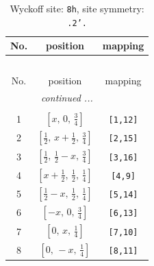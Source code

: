 \documentclass[fleqn,8pt]{jsarticle}
\begin{document}
\begin{longtable}{ccc}
\caption{Wyckoff site: {\tt 8h}, site symmetry: {\tt .2'.}}
 \\
 \hline \hline
No. & position & mapping \\ \hline \endfirsthead

\multicolumn{2}{l}{\tablename\ \thetable{}} \\
 \hline \hline
No. & position & mapping \\ \hline \endhead

 \hline \hline
\multicolumn{2}{r}{\footnotesize\it continued ...} \\ \endfoot

 \hline \hline
\multicolumn{2}{r}{} \\ \endlastfoot

1 & $\left[ x,\, 0,\, \frac{3}{4} \right]$ & {\tt [1,12]} \\ \hline
2 & $\left[ \frac{1}{2},\, x + \frac{1}{2},\, \frac{3}{4} \right]$ & {\tt [2,15]} \\ \hline
3 & $\left[ \frac{1}{2},\, \frac{1}{2} - x,\, \frac{3}{4} \right]$ & {\tt [3,16]} \\ \hline
4 & $\left[ x + \frac{1}{2},\, \frac{1}{2},\, \frac{1}{4} \right]$ & {\tt [4,9]} \\ \hline
5 & $\left[ \frac{1}{2} - x,\, \frac{1}{2},\, \frac{1}{4} \right]$ & {\tt [5,14]} \\ \hline
6 & $\left[ - x,\, 0,\, \frac{3}{4} \right]$ & {\tt [6,13]} \\ \hline
7 & $\left[ 0,\, x,\, \frac{1}{4} \right]$ & {\tt [7,10]} \\ \hline
8 & $\left[ 0,\, - x,\, \frac{1}{4} \right]$ & {\tt [8,11]} \\
\end{longtable}
\renewcommand{\arraystretch}{1.2}
\end{document}
